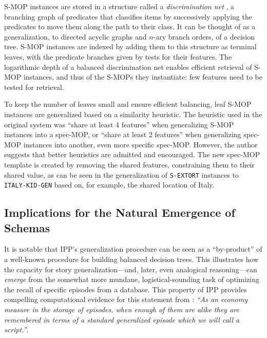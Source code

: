 S-MOP instances are stored in a structure called a \textit{discrimination net} \citep{Charniak:1980:AIP:576572}, a branching graph of predicates that classifies items by successively applying the predicates to move them along the path to their class. It can be thought of as a generalization, to directed acyclic graphs and $n$-ary branch orders, of a decision tree. S-MOP instances are indexed by adding them to this structure as terminal leaves, with the predicate branches given by tests for their features. The logarithmic depth of a balanced discrimination net enables efficient retrieval of S-MOP instances, and thus of the S-MOPs they instantiate: few features need to be tested for retrieval.

To keep the number of leaves small and ensure efficient balancing, leaf S-MOP instances are generalized based on a similarity heuristic. The heuristic used in the original system was ``share at least 4 features'' when generalizing S-MOP instances into a spec-MOP, or ``share at least 2 features'' when generalizing spec-MOP instances into another, even more specific spec-MOP. However, the author suggests that better heuristics are admitted and encouraged. The new spec-MOP template is created by removing the shared features, constraining them to their shared value, as can be seen in the generalization of \texttt{S-EXTORT} instances to \texttt{ITALY-KID-GEN} based on, for example, the shared location of Italy.

\subsection{Implications for the Natural Emergence of Schemas}
It is notable that IPP's generalization procedure can be seen as a ``by-product'' of a well-known procedure for building balanced decision trees.
This illustrates how the capacity for story generalization---and, later, even analogical reasoning---can \textit{emerge} from the somewhat more mundane, logistical-sounding task of optimizing the recall of specific episodes from a database. This property of IPP provides compelling computational evidence for this statement from \citep{schankandabelson}: \textit{``As an economy measure in the storage of episodes, when enough of them are alike they are remembered in terms of a standard generalized episode which we will call a script.''}.

